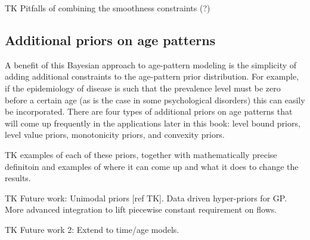 TK Pitfalls of combining the smoothness constraints (?)

\subsection{Additional priors on age patterns}
A benefit of this Bayesian approach to age-pattern modeling is the
simplicity of adding additional constraints to the age-pattern prior
distribution.  For example, if the epidemiology of disease is such
that the prevalence level must be zero before a certain age (as is the
case in some psychological disorders) this can easily be incorporated.
There are four types of additional priors on age patterns that will
come up frequently in the applications later in this book: level bound
priors, level value priors, monotonicity priors, and convexity priors.

TK examples of each of these priors, together with mathematically
precise definitoin and examples of where it can come up and what it
does to change the results.

TK Future work: Unimodal priors [ref TK].  Data driven hyper-priors
for GP.  More advanced integration to lift piecewise constant
requirement on flows.

TK Future work 2: Extend to time/age models.

